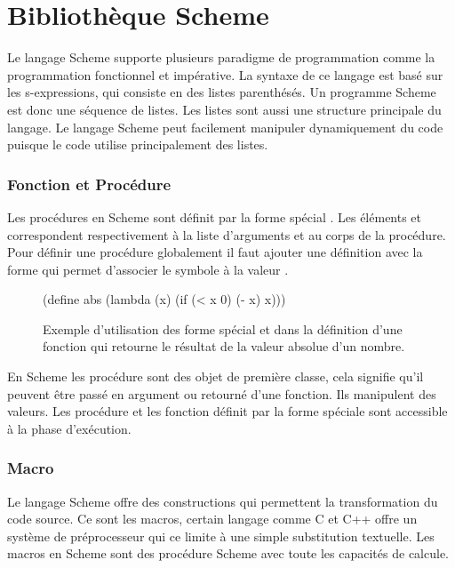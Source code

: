 
\chapter{Bibliothèque Scheme}
Le langage Scheme supporte plusieurs paradigme de programmation comme
la programmation fonctionnel et impérative. La syntaxe de ce langage
est basé sur les s-expressions, qui consiste en des listes parenthésés.
Un programme Scheme est donc une séquence de listes. Les listes sont
aussi une structure principale du langage. Le langage Scheme peut facilement
manipuler dynamiquement du code puisque le code utilise principalement des listes.

\subsection{Fonction et Procédure}
Les procédures en Scheme sont définit par la forme spécial .
Les éléments  et  correspondent respectivement à la liste
d'arguments et au corps de la procédure. Pour définir une procédure globalement il faut
ajouter une définition avec la forme  qui permet d'associer le
symbole  à la valeur .

\begin{figure}[ht]
  \begin{center}
    \begin{mplisting}{0.25}
(define abs
  (lambda (x)
    (if (< x 0)
      (- x)
      x)))
\end{mplisting}
  \end{center}
  \caption{Exemple d'utilisation des forme spécial  et  dans
  la définition d'une fonction qui retourne le résultat de la valeur absolue d'un nombre.}
\end{figure}

En Scheme les procédure sont des objet de première classe, cela signifie qu'il
peuvent être passé en argument ou retourné d'une fonction. Ils manipulent des
valeurs.  Les procédure et les fonction définit par la forme spéciale
 sont accessible à la phase d'exécution.

\subsection{Macro}
Le langage Scheme offre des constructions qui permettent la transformation
du code source. Ce sont les macros, certain langage comme C et C++ offre un système
de préprocesseur qui ce limite à une simple substitution textuelle. Les macros en Scheme
sont des procédure Scheme avec toute les capacités de calcule.

